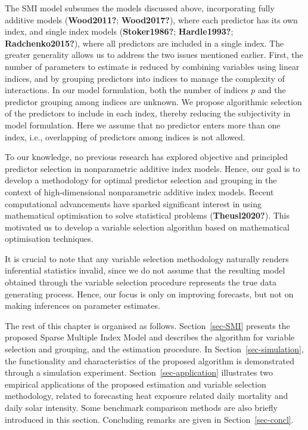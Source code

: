 \documentclass[
  11pt,
  a4paper,
]{report}
\begin{document}
The SMI model subsumes the models discussed above, incorporating fully
additive models (\textbf{Wood2011?}; \textbf{Wood2017?}), where each
predictor has its own index, and single index models
(\textbf{Stoker1986?}; \textbf{Hardle1993?}; \textbf{Radchenko2015?}),
where all predictors are included in a single index. The greater
generality allows us to address the two issues mentioned earlier. First,
the number of parameters to estimate is reduced by combining variables
using linear indices, and by grouping predictors into indices to manage
the complexity of interactions. In our model formulation, both the
number of indices \(p\) and the predictor grouping among indices are
unknown. We propose algorithmic selection of the predictors to include
in each index, thereby reducing the subjectivity in model formulation.
Here we assume that no predictor enters more than one index, i.e.,
overlapping of predictors among indices is not allowed.

To our knowledge, no previous research has explored objective and
principled predictor selection in nonparametric additive index models.
Hence, our goal is to develop a methodology for optimal predictor
selection and grouping in the context of high-dimensional nonparametric
additive index models. Recent computational advancements have sparked
significant interest in using mathematical optimisation to solve
statistical problems (\textbf{Theusl2020?}). This motivated us to
develop a variable selection algorithm based on mathematical
optimisation techniques.

It is crucial to note that any variable selection methodology naturally
renders inferential statistics invalid, since we do not assume that the
resulting model obtained through the variable selection procedure
represents the true data generating process. Hence, our focus is only on
improving forecasts, but not on making inferences on parameter
estimates.

The rest of this chapter is organised as follows. Section~\ref{sec-SMI}
presents the proposed Sparse Multiple Index Model and describes the
algorithm for variable selection and grouping, and the estimation
procedure. In Section~\ref{sec-simulation}, the functionality and
characteristics of the proposed algorithm is demonstrated through a
simulation experiment. Section~\ref{sec-application} illustrates two
empirical applications of the proposed estimation and variable selection
methodology, related to forecasting heat exposure related daily
mortality and daily solar intensity. Some benchmark comparison methods
are also briefly introduced in this section. Concluding remarks are
given in Section~\ref{sec-concl}.
\end{document}

